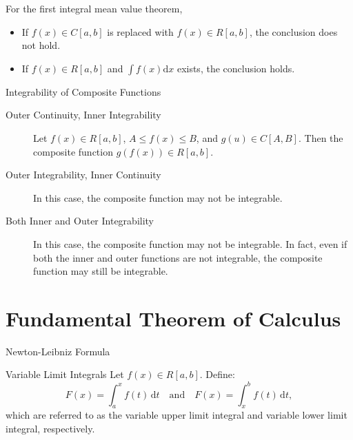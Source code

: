 \documentclass[11pt]{../../TexTemplate/elegantbook}
\begin{document}
\begin{note}
    For the first integral mean value theorem, 
    \begin{itemize}
        \item If \( f(x) \in C[a, b] \) is replaced with \( f(x) \in R[a, b] \), the conclusion does not hold.
        \item If \( f(x) \in R[a, b] \) and \( \int f(x)\mathrm{d}x \) exists, the conclusion holds.
    \end{itemize}
\end{note}


\begin{leftbarTitle}{Integrability of Composite Functions}\end{leftbarTitle}

\begin{description}
    \item [Outer Continuity, Inner Integrability] Let \( f(x) \in R[a, b] \), \( A \leqslant f(x) \leqslant B \), 
        and \( g(u) \in C[A, B] \). Then the composite function \( g(f(x)) \in R[a, b] \).
    \item [Outer Integrability, Inner Continuity] In this case, the composite function may not be integrable.

    \item [Both Inner and Outer Integrability] In this case, the composite function may not be integrable. 
        In fact, even if both the inner and outer functions are not integrable, the composite function may still be integrable.
\end{description}



\section{Fundamental Theorem of Calculus}
\begin{leftbarTitle}{Newton-Leibniz Formula}\end{leftbarTitle}
\begin{definition}{Variable Limit Integrals}
    Let \( f(x) \in R[a, b] \). Define:
    \[
    F(x) = \int_{a}^{x} f(t) \, \mathrm{d}t \quad \text{and} \quad F(x) = \int_{x}^{b} f(t) \, \mathrm{d}t,
    \]
    which are referred to as the variable upper limit integral and variable lower limit integral, respectively.
\end{definition}
\end{document}
